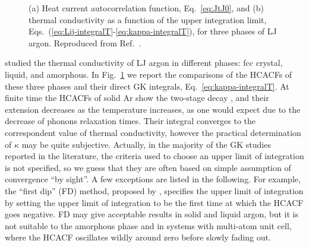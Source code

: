 \begin{LEtext}
\begin{figure}[!tb]
    \begin{center}
        \hfill
    \end{center}
	\caption{(a) Heat current autocorrelation function, Eq.~\eqref{eq:JtJ0}, and
    (b) thermal conductivity as a function of the upper integration limit, Eqs.~(\ref{eq:Lij-integralT}-\ref{eq:kappa-integralT}), for three phases of LJ argon. Reproduced from Ref.~\cite{McGaughey2004a}.} \label{fig:argon-gk-phases-examples}
\end{figure}
\citet{McGaughey2006,McGaughey2004a} studied the thermal conductivity of LJ argon in different phases: fcc crystal, liquid, and amorphous. In Fig.~\ref{fig:argon-gk-phases-examples} we report the comparisons of the HCACFs of these three phases and their direct GK integrals, Eq.~\eqref{eq:kappa-integralT}. At finite time the HCACFs of solid Ar show the two-stage decay \cite{Ladd1986}, and their extension decreases as the temperature increases, as one would expect due to the decrease of phonons relaxation times. 
Their integral converges to the correspondent value of thermal conductivity, however the practical determination of $\kappa$ may be quite subjective. Actually, in the majority of the GK studies reported in the literature, the criteria used to choose an upper limit of integration is not specified, so we guess that they are often based on simple assumption of convergence ``by sight''. 
A few exceptions are listed in the following. For example, the ``first dip'' (FD) method, proposed by \citet{Li1998}, specifies the upper limit of integration by setting the upper limit of integration to be the first time at which the HCACF goes negative. FD may give acceptable results in solid and liquid argon, but it is not suitable to the amorphous phase and in systems with multi-atom unit cell, where the HCACF oscillates wildly around zero before slowly fading out. 


\end{LEtext}
